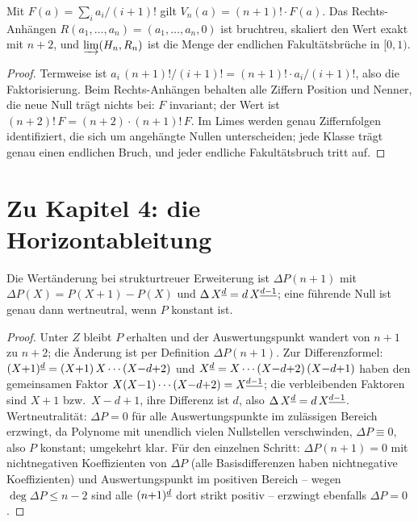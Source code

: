\begin{satz}
Mit $F(a)=\sum_i a_i/(i+1)!$ gilt $V_n(a)=(n+1)!\cdot F(a)$. Das
Rechts-Anhängen $R(a_1,\ldots,a_n)=(a_1,\ldots,a_n,0)$ ist
bruchtreu, skaliert den Wert exakt mit $n+2$, und
$\varinjlim(H_n,R_n)$ ist die Menge der endlichen
Fakultätsbrüche in $[0,1)$.
\end{satz}

\begin{proof}
Termweise ist $a_i\,(n+1)!/(i+1)!=(n+1)!\cdot a_i/(i+1)!$, also die
Faktorisierung. Beim Rechts-Anhängen behalten alle Ziffern Position
und Nenner, die neue Null trägt nichts bei: $F$ invariant; der Wert
ist $(n+2)!\,F=(n+2)\cdot(n+1)!\,F$. Im Limes werden genau
Ziffernfolgen identifiziert, die sich um angehängte Nullen
unterscheiden; jede Klasse trägt genau einen endlichen Bruch, und
jeder endliche Fakultätsbruch tritt auf.
\end{proof}

\section*{Zu Kapitel 4: die Horizontableitung}

\begin{satz}
Die Wertänderung bei strukturtreuer Erweiterung ist
$\Delta P(n+1)$ mit $\Delta P(X)=P(X{+}1)-P(X)$ und
$\Delta\,X^{\underline{d}}=d\,X^{\underline{d-1}}$; eine führende Null ist genau dann
wertneutral, wenn $P$ konstant ist.
\end{satz}

\begin{proof}
Unter $Z$ bleibt $P$ erhalten und der Auswertungspunkt wandert von
$n{+}1$ zu $n{+}2$; die Änderung ist per Definition
$\Delta P(n{+}1)$. Zur Differenzformel:
$(X{+}1)^{\underline{d}}=(X{+}1)\,X\cdots(X{-}d{+}2)$ und
$X^{\underline{d}}=X\cdots(X{-}d{+}2)\,(X{-}d{+}1)$ haben den gemeinsamen
Faktor $X(X{-}1)\cdots(X{-}d{+}2)=X^{\underline{d-1}}$; die verbleibenden
Faktoren sind $X{+}1$ bzw.\ $X{-}d{+}1$, ihre Differenz ist $d$,
also $\Delta\,X^{\underline{d}}=d\,X^{\underline{d-1}}$.
Wertneutralität: $\Delta P=0$ für alle Auswertungspunkte im
zulässigen Bereich erzwingt, da Polynome mit unendlich vielen
Nullstellen verschwinden, $\Delta P\equiv0$, also $P$ konstant;
umgekehrt klar. Für den einzelnen Schritt: $\Delta P(n{+}1)=0$ mit
nichtnegativen Koeffizienten von $\Delta P$ (alle
Basisdifferenzen haben nichtnegative Koeffizienten) und
Auswertungspunkt im positiven Bereich -- wegen
$\deg\Delta P\le n-2$ sind alle $(n{+}1)^{\underline{d}}$ dort strikt
positiv -- erzwingt ebenfalls $\Delta P=0$.
\end{proof}

